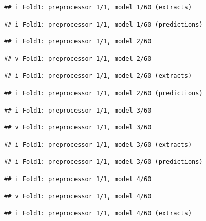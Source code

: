 \documentclass[
]{article}
\begin{document}
\begin{verbatim}
## i Fold1: preprocessor 1/1, model 1/60 (extracts)
\end{verbatim}

\begin{verbatim}
## i Fold1: preprocessor 1/1, model 1/60 (predictions)
\end{verbatim}

\begin{verbatim}
## i Fold1: preprocessor 1/1, model 2/60
\end{verbatim}

\begin{verbatim}
## v Fold1: preprocessor 1/1, model 2/60
\end{verbatim}

\begin{verbatim}
## i Fold1: preprocessor 1/1, model 2/60 (extracts)
\end{verbatim}

\begin{verbatim}
## i Fold1: preprocessor 1/1, model 2/60 (predictions)
\end{verbatim}

\begin{verbatim}
## i Fold1: preprocessor 1/1, model 3/60
\end{verbatim}

\begin{verbatim}
## v Fold1: preprocessor 1/1, model 3/60
\end{verbatim}

\begin{verbatim}
## i Fold1: preprocessor 1/1, model 3/60 (extracts)
\end{verbatim}

\begin{verbatim}
## i Fold1: preprocessor 1/1, model 3/60 (predictions)
\end{verbatim}

\begin{verbatim}
## i Fold1: preprocessor 1/1, model 4/60
\end{verbatim}

\begin{verbatim}
## v Fold1: preprocessor 1/1, model 4/60
\end{verbatim}

\begin{verbatim}
## i Fold1: preprocessor 1/1, model 4/60 (extracts)
\end{verbatim}
\end{document}
